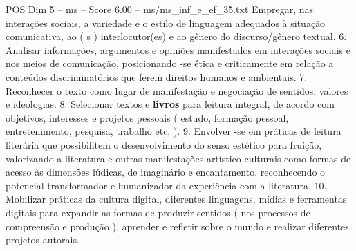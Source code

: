 \begin{textsample}{POS Dim 5 – ms – Score 6.00 – ms/ms\_inf\_e\_ef\_35.txt}
Empregar, nas interações sociais, a variedade e o estilo de linguagem adequados à situação comunicativa, ao ( s ) interlocutor(es) e ao gênero do discurso/gênero textual. 6.
Analisar informações, argumentos e opiniões manifestados em interações sociais e nos meios de comunicação, posicionando -se ética e criticamente em relação a conteúdos discriminatórios que ferem direitos humanos e ambientais. 7.
Reconhecer o texto como lugar de manifestação e negociação de sentidos, valores e ideologias. 8.
Selecionar textos e \textbf{livros} para leitura integral, de acordo com objetivos, interesses e projetos pessoais ( estudo, formação pessoal, entretenimento, pesquisa, trabalho etc. ). 9.
Envolver -se em práticas de leitura literária que possibilitem o desenvolvimento do senso estético para fruição, valorizando a literatura e outras manifestações artístico-culturais como formas de acesso às dimensões lúdicas, de imaginário e encantamento, reconhecendo o potencial transformador e humanizador da experiência com a literatura. 10.
Mobilizar práticas da cultura digital, diferentes linguagens, mídias e ferramentas digitais para expandir as formas de produzir sentidos ( nos processos de compreensão e produção ), aprender e refletir sobre o mundo e realizar diferentes projetos autorais.

\end{textsample}
